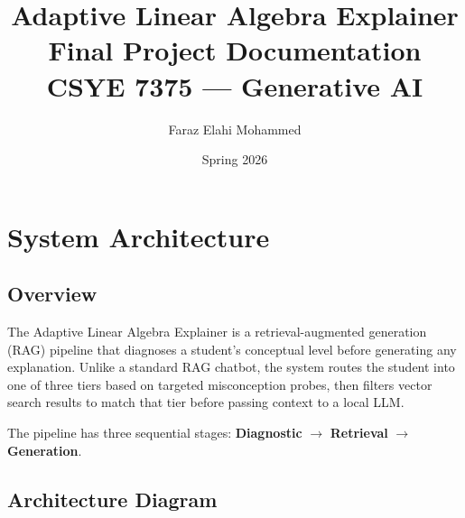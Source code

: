 \documentclass[11pt]{article}
\title{\textbf{Adaptive Linear Algebra Explainer}\\[0.4em]
\large Final Project Documentation\\
CSYE 7375 — Generative AI}
\author{Faraz Elahi Mohammed}
\date{Spring 2026}
\begin{document}
\maketitle
\tableofcontents
\newpage

\section{System Architecture}

\subsection{Overview}

The Adaptive Linear Algebra Explainer is a retrieval-augmented generation (RAG) pipeline that diagnoses a student's conceptual level before generating any explanation. Unlike a standard RAG chatbot, the system routes the student into one of three tiers based on targeted misconception probes, then filters vector search results to match that tier before passing context to a local LLM.

The pipeline has three sequential stages: \textbf{Diagnostic} $\to$ \textbf{Retrieval} $\to$ \textbf{Generation}.

\subsection{Architecture Diagram}
\end{document}
